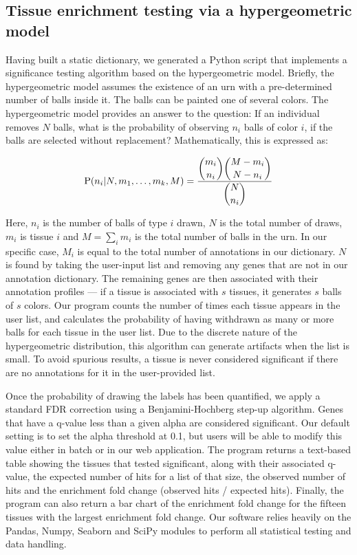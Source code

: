 \documentclass[linenumbers, doublespacing]{bmcart}
\begin{document}
\subsection*{Tissue enrichment testing via a hypergeometric model}
	Having built a static dictionary, we generated a Python script that implements a significance testing algorithm based on the hypergeometric model. Briefly, the hypergeometric model assumes the existence of an urn with a pre-determined number of balls inside it. The balls can be painted one of several colors. The hypergeometric model provides an answer to the question: If an individual removes $N$ balls, what is the probability of observing $n_i$ balls of color $i$, if the balls are selected without replacement? Mathematically, this is expressed as:
	
\begin{eqnarray}\label{hypergeometric}
	\mathrm{P}(n_i | N, m_1,\ldots, m_k, M) = \frac{\dbinom{m_i}{n_i} \dbinom{M-m_i}{N - n_i}}{\dbinom{N}{n_i}}
\end{eqnarray}

	Here, $n_i$ is the number of balls of type $i$ drawn, $N$ is the total number of draws, $m_i$ is tissue $i$ and $M = \sum_i m_i$ is the total number of balls in the urn. In our specific case, $M_i$ is equal to the total number of annotations in our dictionary. $N$ is found by taking the user-input list and removing any genes that are not in our annotation dictionary. The remaining genes are then associated with their annotation profiles — if a tissue is associated with $s$ tissues, it generates $s$ balls of $s$ colors. Our program counts the number of times each tissue appears in the user list, and calculates the probability of having withdrawn as many or more balls for each tissue in the user list. Due to the discrete nature of the hypergeometric distribution, this algorithm can generate artifacts when the list is small. To avoid spurious results, a tissue is never considered significant if there are no annotations for it in the user-provided list. 
	
	Once the probability of drawing the labels has been quantified, we apply a standard FDR correction using a Benjamini-Hochberg step-up algorithm\cite{Benjamini1995}. Genes that have a q-value less than a given alpha are considered significant. Our default setting is to set the alpha threshold at 0.1, but users will be able to modify this value either in batch or in our web application. The program returns a text-based table showing the tissues that tested significant, along with their associated q-value, the expected number of hits for a list of that size, the observed number of hits and the enrichment fold change (observed hits / expected hits). Finally, the program can also return a bar chart of the enrichment fold change for the fifteen tissues with the largest enrichment fold change. Our software relies heavily on the Pandas, Numpy, Seaborn and SciPy modules to perform all statistical testing and data handling\cite{McKinney2011, VanDerWalt2011, Oliphant2007}. 
	
\end{document}
